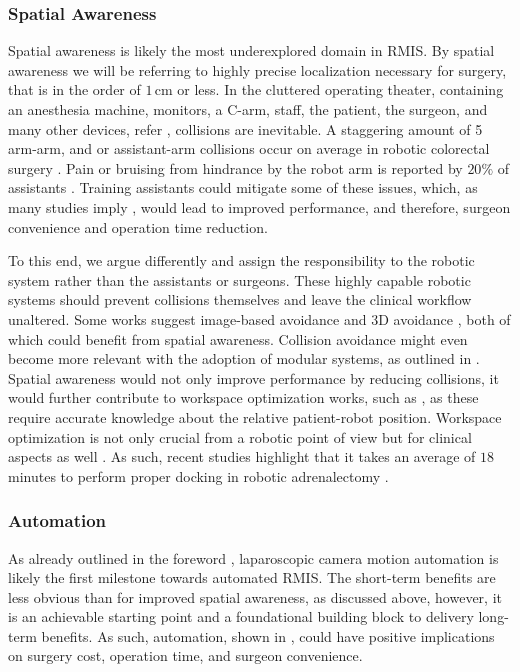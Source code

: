 \subsubsection{Spatial Awareness}
Spatial awareness is likely the most underexplored domain in RMIS. By spatial awareness we will be referring to highly precise localization necessary for surgery, that is in the order of $1\,\text{cm}$ or less. In the cluttered operating theater, containing an anesthesia machine, monitors, a C-arm, staff, the patient, the surgeon, and many other devices, refer , collisions are inevitable. A staggering amount of 5 arm-arm, and or assistant-arm collisions occur on average in robotic colorectal surgery \cite{wong2023improving}. Pain or bruising from hindrance by the robot arm is reported by $20\%$ of assistants  \cite{van2019ergonomic}. Training assistants could mitigate some of these issues, which, as many studies imply \cite{cimen2019does, mitsinikos2017does, kwon2020impact}, would lead to improved performance, and therefore, surgeon convenience and operation time reduction. 

To this end, we argue differently and assign the responsibility to the robotic system rather than the assistants or surgeons. These highly capable robotic systems should prevent collisions themselves and leave the clinical workflow unaltered. Some works suggest image-based avoidance \cite{hameed2016towards} and 3D avoidance \cite{li2023three}, both of which could benefit from spatial awareness. Collision avoidance might even become more relevant with the adoption of modular systems, as outlined in . Spatial awareness would not only improve performance by reducing collisions, it would further contribute to workspace optimization works, such as \cite{hutzl2015knowledge, zelechowski2023automatic}, as these require accurate knowledge about the relative patient-robot position. Workspace optimization is not only crucial from a robotic point of view but for clinical aspects as well \cite{alhusseinawi2023validation}. As such, recent studies highlight that it takes an average of $18$ minutes to perform proper docking in robotic adrenalectomy \cite{feng2020robot}.

\subsubsection{Automation}
As already outlined in the foreword , laparoscopic camera motion automation is likely the first milestone towards automated RMIS. The short-term benefits are less obvious than for improved spatial awareness, as discussed above, however, it is an achievable starting point and a foundational building block to delivery long-term benefits. As such, automation, shown in , could have positive implications on surgery cost, operation time, and surgeon convenience.

